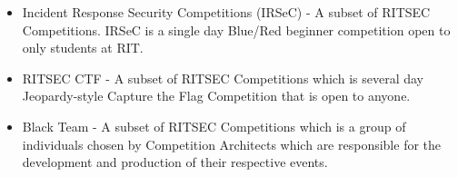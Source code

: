 \begin{itemize}
  \item Incident Response Security Competitions (IRSeC) - A subset of RITSEC 
    Competitions. IRSeC is a single day Blue/Red 
    beginner competition open to only students at RIT.

  \item RITSEC CTF - A subset of RITSEC Competitions which is several day
    Jeopardy-style Capture the Flag Competition that is open to anyone.
  
  \item Black Team - A subset of RITSEC Competitions which is a group of 
    individuals chosen by Competition Architects which are responsible for the
    development and production of their respective events.

\end{itemize}
